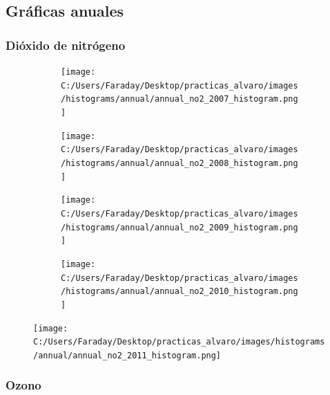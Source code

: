 \documentclass[12pt]{article}
\begin{document}
\subsection*{Gráficas anuales}
%

\subsubsection*{Dióxido de nitrógeno}
%

\begin{figure}[H]
\centering
\begin{subfigure}[h]{0.45\textwidth}
\texttt{[image: C:/Users/Faraday/Desktop/practicas\_alvaro/images/histograms/annual/annual\_no2\_2007\_histogram.png]}
\caption{}
\label{fig:hist-ann-1-1}
\end{subfigure}
%
\begin{subfigure}[H]{0.45\textwidth}
\texttt{[image: C:/Users/Faraday/Desktop/practicas\_alvaro/images/histograms/annual/annual\_no2\_2008\_histogram.png]}
\caption{}
\label{fig:hist-ann-1-2}
\end{subfigure}
\caption{}
\end{figure}

\begin{figure}[H]
\centering
\begin{subfigure}[h]{0.45\textwidth}
\texttt{[image: C:/Users/Faraday/Desktop/practicas\_alvaro/images/histograms/annual/annual\_no2\_2009\_histogram.png]}
\caption{}
\label{fig:hist-ann-1-3}
\end{subfigure}
%
\begin{subfigure}[H]{0.45\textwidth}
\texttt{[image: C:/Users/Faraday/Desktop/practicas\_alvaro/images/histograms/annual/annual\_no2\_2010\_histogram.png]}
\caption{}
\label{fig:hist-ann-1-4}
\end{subfigure}
\caption{}
\end{figure}

\begin{figure}[H]
\centering
\texttt{[image: C:/Users/Faraday/Desktop/practicas\_alvaro/images/histograms/annual/annual\_no2\_2011\_histogram.png]}
\label{fig:hist-ann-1-5}
\caption{}
\end{figure}

\newpage

\subsubsection*{Ozono}
%
\end{document}
